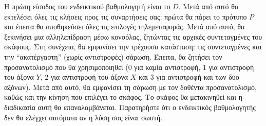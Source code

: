 \documentclass[12pt]{article}
\begin{document}
Η πρώτη είσοδος του ενδεικτικού βαθμολογητή είναι το $D$. Μετά από αυτό θα εκτελέσει όλες τις κλήσεις προς τις συναρτήσεις σας: πρώτα θα πάρει το πρότυπο $P$ και έπειτα θα αποθηκεύσει όλες τις επιλογές τηλεμεταφοράς. Μετά από αυτό, θα ξεκινήσει μια αλληλεπίδραση μέσω κονσόλας, ζητώντας τις αρχικές συντεταγμένες του σκάφους. Στη συνέχεια, θα εμφανίσει την τρέχουσα κατάσταση: τις συντεταγμένες και την ``ακατέργαστη'' (χωρίς αντιστροφές) σάρωση. Έπειτα, θα ζητήσει τον προσανατολισμό που θα χρησιμοποιηθεί ($0$ για καμία αντιστροφή, $1$ για αντιστροφή του άξονα $Y$, $2$ για αντιστροφή του άξονα $X$ και $3$ για αντιστροφή και των δύο αξόνων). Μετά από αυτό, θα εμφανίσει τη σάρωση με τον δοθέντα προσανατολισμό, καθώς και την κίνηση που επιλέγει το σκάφος. Το σκάφος θα μετακινηθεί και η διαδικασία αυτή θα επαναλαμβάνεται. Παρατηρήστε ότι ο ενδεικτικός βαθμολογητής δεν θα ελέγχει αυτόματα αν η λύση σας είναι σωστή.
\end{document}
